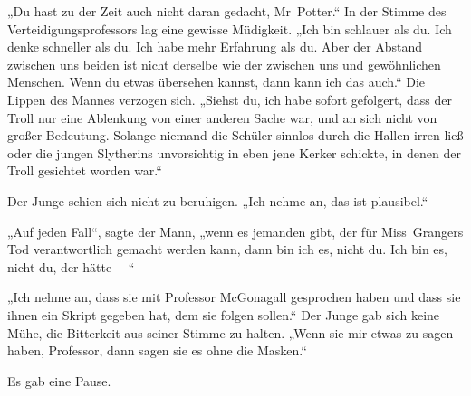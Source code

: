 „Du hast zu der Zeit auch nicht daran gedacht, Mr~Potter.“
In der Stimme des Verteidigungsprofessors lag eine gewisse Müdigkeit.
„Ich bin schlauer als du. Ich denke schneller als du. Ich habe mehr Erfahrung als du. Aber der Abstand zwischen uns beiden ist nicht derselbe wie der zwischen uns und gewöhnlichen Menschen. Wenn du etwas übersehen kannst, dann kann ich das auch.“ Die Lippen des Mannes verzogen sich.
„Siehst du, ich habe sofort gefolgert, dass der Troll nur eine Ablenkung von einer anderen Sache war, und an sich nicht von großer Bedeutung. Solange niemand die Schüler sinnlos durch die Hallen irren ließ oder die jungen Slytherins unvorsichtig in eben jene Kerker schickte, in denen der Troll gesichtet worden war.“

Der Junge schien sich nicht zu beruhigen.
„Ich nehme an, das ist plausibel.“

„Auf jeden Fall“, sagte der Mann, „wenn es jemanden gibt, der für Miss~Grangers Tod verantwortlich gemacht werden kann, dann bin ich es, nicht du. Ich bin es, nicht du, der hätte —“

„Ich nehme an, dass sie mit Professor McGonagall gesprochen haben und dass sie ihnen ein Skript gegeben hat, dem sie folgen sollen.“ Der Junge gab sich keine Mühe, die Bitterkeit aus seiner Stimme zu halten.
„Wenn sie mir etwas zu sagen haben, Professor, dann sagen sie es ohne die Masken.“

Es gab eine Pause.

